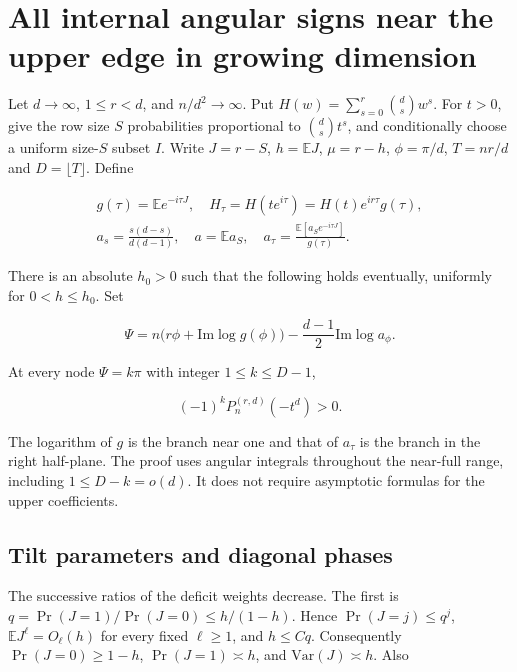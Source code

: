 \section{All internal angular signs near the upper edge in growing dimension}\label{sec:near-full-all-angular-signs}

Let $d\to\infty$, $1\le r<d$, and $n/d^2\to\infty$. Put $H(w)=\sum_{s=0}^r\binom ds w^s$. For $t>0$, give the row size $S$ probabilities proportional to $\binom ds t^s$, and conditionally choose a uniform size-$S$ subset $I$. Write $J=r-S$, $h=\mathbb E J$, $\mu=r-h$, $\phi=\pi/d$, $T=nr/d$ and $D=\lfloor T\rfloor$. Define

\begin{equation*}
\begin{gathered}
g(\tau)=\mathbb E e^{-i\tau J},\quad
H_\tau=H(te^{i\tau})=H(t)e^{ir\tau}g(\tau),\\
a_s=\frac{s(d-s)}{d(d-1)},\quad
a=\mathbb E a_S,\quad a_\tau=\frac{\mathbb E[a_S e^{-i\tau J}]}{g(\tau)}.
\end{gathered}
\end{equation*}

There is an absolute $h_0>0$ such that the following holds eventually, uniformly for $0<h\le h_0$. Set

\begin{equation*}
\Psi=n\bigl(r\phi+\mathrm{Im}\log g(\phi)\bigr)
 -\frac{d-1}{2}\mathrm{Im}\log a_\phi .
\end{equation*}

At every node $\Psi=k\pi$ with integer $1\le k\le D-1$,

\begin{equation*}
(-1)^kP_n^{(r,d)}(-t^d)>0.
\end{equation*}

The logarithm of $g$ is the branch near one and that of $a_\tau$ is the branch in the right half-plane. The proof uses angular integrals throughout the near-full range, including $1\le D-k=o(d)$. It does not require asymptotic formulas for the upper coefficients.

\subsection{Tilt parameters and diagonal phases}

The successive ratios of the deficit weights decrease. The first is $q=\Pr(J=1)/\Pr(J=0)\le h/(1-h)$. Hence $\Pr(J=j)\le q^j$, $\mathbb E J^\ell=O_\ell(h)$ for every fixed $\ell\ge1$, and $h\le Cq$. Consequently $\Pr(J=0)\ge1-h$, $\Pr(J=1)\asymp h$, and $\mathrm{Var}(J)\asymp h$. Also

